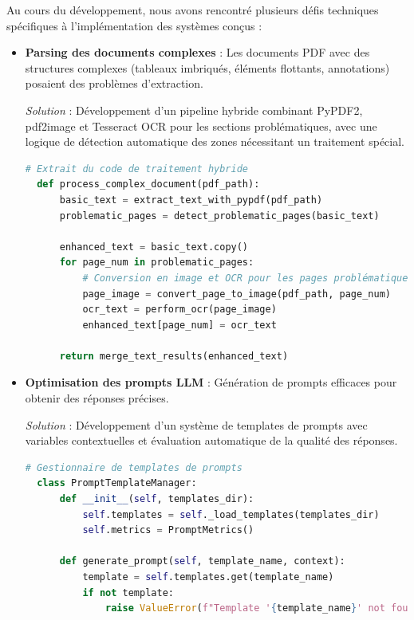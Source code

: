 Au cours du développement, nous avons rencontré plusieurs défis techniques spécifiques à l'implémentation des systèmes conçus :

\begin{itemize}
  \item \textbf{Parsing des documents complexes} : Les documents PDF avec des structures complexes (tableaux imbriqués, éléments flottants, annotations) posaient des problèmes d'extraction.
  
  \textit{Solution} : Développement d'un pipeline hybride combinant PyPDF2, pdf2image et Tesseract OCR pour les sections problématiques, avec une logique de détection automatique des zones nécessitant un traitement spécial.
  
  \begin{lstlisting}[style=codestyle, language=Python]
  # Extrait du code de traitement hybride
  def process_complex_document(pdf_path):
      basic_text = extract_text_with_pypdf(pdf_path)
      problematic_pages = detect_problematic_pages(basic_text)
      
      enhanced_text = basic_text.copy()
      for page_num in problematic_pages:
          # Conversion en image et OCR pour les pages problématiques
          page_image = convert_page_to_image(pdf_path, page_num)
          ocr_text = perform_ocr(page_image)
          enhanced_text[page_num] = ocr_text
          
      return merge_text_results(enhanced_text)
  \end{lstlisting}
  
  \item \textbf{Optimisation des prompts LLM} : Génération de prompts efficaces pour obtenir des réponses précises.
  
  \textit{Solution} : Développement d'un système de templates de prompts avec variables contextuelles et évaluation automatique de la qualité des réponses.
  
  \begin{lstlisting}[style=codestyle, language=Python]
  # Gestionnaire de templates de prompts
  class PromptTemplateManager:
      def __init__(self, templates_dir):
          self.templates = self._load_templates(templates_dir)
          self.metrics = PromptMetrics()
      
      def generate_prompt(self, template_name, context):
          template = self.templates.get(template_name)
          if not template:
              raise ValueError(f"Template '{template_name}' not found")
          

\end{lstlisting}
\end{itemize}
